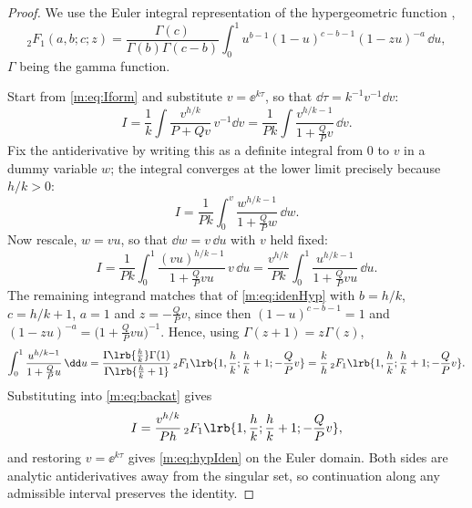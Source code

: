 \begin{proof}
We use the Euler integral representation of the hypergeometric function
\cite{Olver2010},
\begin{equation}
\label{m:eq:idenHyp}
{}_2F_1(a,b;c;z)
= \frac{\Gamma(c)}{\Gamma(b)\Gamma(c-b)}\int_0^1 u^{b-1}(1-u)^{c-b-1}(1-zu)^{-a}\,\dd u ,
\end{equation}
$\Gamma$ being the gamma function.

Start from \cref{m:eq:Iform} and substitute $v = \ee^{k\tau}$, so that
$\dd\tau = k^{-1}v^{-1}\dd v$:
\begin{equation*}
I = \frac1k\int\frac{v^{h/k}}{P+Qv}\,v^{-1}\dd v
= \frac{1}{Pk}\int\frac{v^{h/k-1}}{1+\frac{Q}{P}v}\,\dd v .
\end{equation*}
Fix the antiderivative by writing this as a definite integral from $0$ to $v$ in a
dummy variable $w$; the integral converges at the lower limit precisely because
$h/k>0$:
\begin{equation*}
I = \frac{1}{Pk}\int_0^v\frac{w^{h/k-1}}{1+\frac{Q}{P}w}\,\dd w .
\end{equation*}
Now rescale, $w = vu$, so that $\dd w = v\,\dd u$ with $v$ held fixed:
\begin{equation}
\label{m:eq:backat}
I = \frac{1}{Pk}\int_0^1\frac{(vu)^{h/k-1}}{1+\frac{Q}{P}vu}\,v\,\dd u
= \frac{v^{h/k}}{Pk}\int_0^1\frac{u^{h/k-1}}{1+\frac{Q}{P}vu}\,\dd u .
\end{equation}
The remaining integrand matches that of \cref{m:eq:idenHyp} with $b = h/k$,
$c = h/k+1$, $a=1$ and $z = -\tfrac{Q}{P}v$, since then $(1-u)^{c-b-1} = 1$ and
$(1-zu)^{-a} = \bigl(1+\tfrac{Q}{P}vu\bigr)^{-1}$. Hence, using
$\Gamma(z+1) = z\Gamma(z)$,
\begin{equation*}
\int_0^1\frac{u^{h/k-1}}{1+\frac{Q}{P}u}\,\dd u
= \frac{\Gamma\!\lrb{\frac hk}\Gamma(1)}{\Gamma\!\lrb{\frac hk+1}}\,
{}_2F_1\lrb{1,\frac hk;\frac hk+1;-\frac QP v}
= \frac kh\,{}_2F_1\lrb{1,\frac hk;\frac hk+1;-\frac QP v}.
\end{equation*}
Substituting into \cref{m:eq:backat} gives
\begin{equation*}
I = \frac{v^{h/k}}{Ph}\,{}_2F_1\lrb{1,\frac hk;\frac hk+1;-\frac QP v},
\end{equation*}
and restoring $v = \ee^{k\tau}$ gives \cref{m:eq:hypIden} on the Euler domain.
Both sides are analytic antiderivatives away from the singular set, so continuation
along any admissible interval preserves the identity.
\end{proof}

